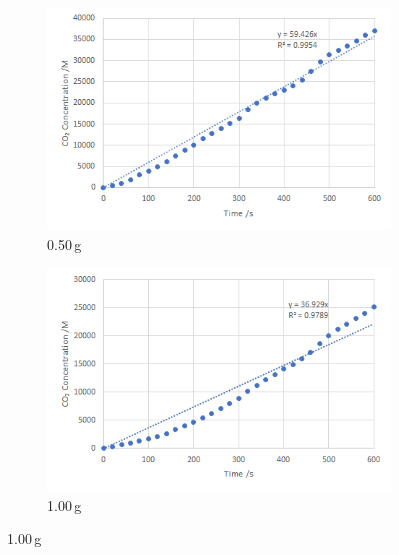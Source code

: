 \documentclass{article}
\begin{document}
\begin{figure}[H]
    \begin{subfigure}{0.49\linewidth}
        \includegraphics[width=\linewidth]{figures/appendix/appendix2_0.50_trial1.png}
        \vspace*{-18pt}
        \caption{0.50\,\si{g}}
    \end{subfigure}
    \begin{subfigure}{0.49\linewidth}
        \includegraphics[width=\linewidth]{figures/appendix/appendix2_1.00_trial1.png}
        \vspace*{-18pt}
        \caption{1.00\,\si{g}}
    \end{subfigure}
\end{figure}
\end{document}
